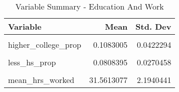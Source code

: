 \begin{table}[H]

\caption{\label{tab:tab:education_and_work}Variable Summary - Education And Work}
\centering
\begin{tabular}[t]{lrr}
\toprule
Variable & Mean & Std. Dev\\
\midrule
\cellcolor{gray!6}{college\_prop} & \cellcolor{gray!6}{0.1938955} & \cellcolor{gray!6}{0.0344116}\\
higher\_college\_prop & 0.1083005 & 0.0422294\\
\cellcolor{gray!6}{hs\_prop} & \cellcolor{gray!6}{0.3656381} & \cellcolor{gray!6}{0.0495126}\\
less\_hs\_prop & 0.0808395 & 0.0270458\\
\cellcolor{gray!6}{some\_college\_prop} & \cellcolor{gray!6}{0.2513264} & \cellcolor{gray!6}{0.0354394}\\
\addlinespace
mean\_hrs\_worked & 31.5613077 & 2.1940441\\
\bottomrule
\end{tabular}
\end{table}
